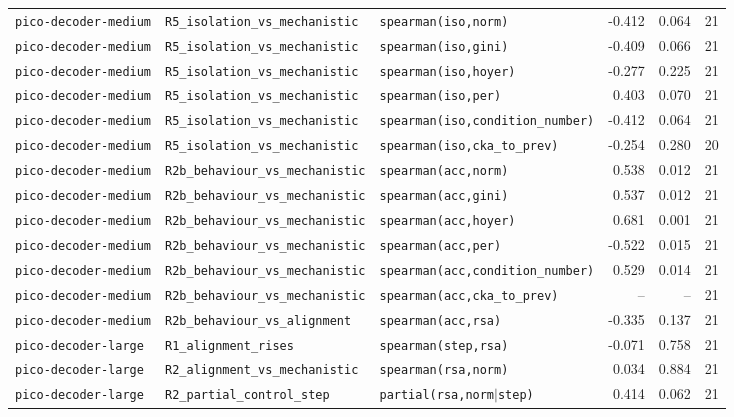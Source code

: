 \begin{longtable}{lllrrr}
\texttt{pico-decoder-medium} & \texttt{R5\_isolation\_vs\_mechanistic} & \texttt{spearman(iso,norm)} & -0.412 & 0.064 & 21 \\
\texttt{pico-decoder-medium} & \texttt{R5\_isolation\_vs\_mechanistic} & \texttt{spearman(iso,gini)} & -0.409 & 0.066 & 21 \\
\texttt{pico-decoder-medium} & \texttt{R5\_isolation\_vs\_mechanistic} & \texttt{spearman(iso,hoyer)} & -0.277 & 0.225 & 21 \\
\texttt{pico-decoder-medium} & \texttt{R5\_isolation\_vs\_mechanistic} & \texttt{spearman(iso,per)} & 0.403 & 0.070 & 21 \\
\texttt{pico-decoder-medium} & \texttt{R5\_isolation\_vs\_mechanistic} & \texttt{spearman(iso,condition\_number)} & -0.412 & 0.064 & 21 \\
\texttt{pico-decoder-medium} & \texttt{R5\_isolation\_vs\_mechanistic} & \texttt{spearman(iso,cka\_to\_prev)} & -0.254 & 0.280 & 20 \\
\texttt{pico-decoder-medium} & \texttt{R2b\_behaviour\_vs\_mechanistic} & \texttt{spearman(acc,norm)} & 0.538 & 0.012 & 21 \\
\texttt{pico-decoder-medium} & \texttt{R2b\_behaviour\_vs\_mechanistic} & \texttt{spearman(acc,gini)} & 0.537 & 0.012 & 21 \\
\texttt{pico-decoder-medium} & \texttt{R2b\_behaviour\_vs\_mechanistic} & \texttt{spearman(acc,hoyer)} & 0.681 & 0.001 & 21 \\
\texttt{pico-decoder-medium} & \texttt{R2b\_behaviour\_vs\_mechanistic} & \texttt{spearman(acc,per)} & -0.522 & 0.015 & 21 \\
\texttt{pico-decoder-medium} & \texttt{R2b\_behaviour\_vs\_mechanistic} & \texttt{spearman(acc,condition\_number)} & 0.529 & 0.014 & 21 \\
\texttt{pico-decoder-medium} & \texttt{R2b\_behaviour\_vs\_mechanistic} & \texttt{spearman(acc,cka\_to\_prev)} & -- & -- & 21 \\
\texttt{pico-decoder-medium} & \texttt{R2b\_behaviour\_vs\_alignment} & \texttt{spearman(acc,rsa)} & -0.335 & 0.137 & 21 \\
\texttt{pico-decoder-large} & \texttt{R1\_alignment\_rises} & \texttt{spearman(step,rsa)} & -0.071 & 0.758 & 21 \\
\texttt{pico-decoder-large} & \texttt{R2\_alignment\_vs\_mechanistic} & \texttt{spearman(rsa,norm)} & 0.034 & 0.884 & 21 \\
\texttt{pico-decoder-large} & \texttt{R2\_partial\_control\_step} & \texttt{partial(rsa,norm$\mid$step)} & 0.414 & 0.062 & 21 \\

\end{longtable}
